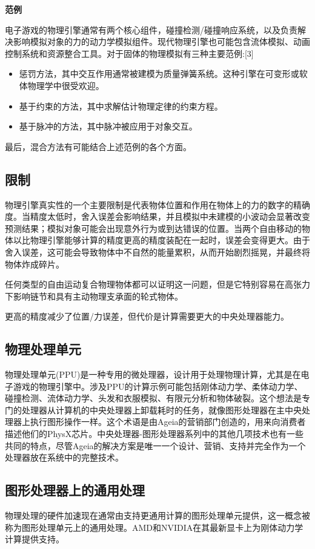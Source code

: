 \textbf{范例}

电子游戏的物理引擎通常有两个核心组件，碰撞检测/碰撞响应系统，以及负责解决影响模拟对象的力的动力学模拟组件。现代物理引擎也可能包含流体模拟、动画控制系统和资源整合工具。对于固体的物理模拟有三种主要范例:[3]
\begin{itemize}
\item 惩罚方法，其中交互作用通常被建模为质量弹簧系统。这种引擎在可变形或软体物理学中很受欢迎。
\item 基于约束的方法，其中求解估计物理定律的约束方程。
\item 基于脉冲的方法，其中脉冲被应用于对象交互。
\end{itemize}

最后，混合方法有可能结合上述范例的各个方面。
\subsection{限制}
物理引擎真实性的一个主要限制是代表物体位置和作用在物体上的力的数字的精确度。当精度太低时，舍入误差会影响结果，并且模拟中未建模的小波动会显著改变预测结果；模拟对象可能会出现意外行为或到达错误的位置。当两个自由移动的物体以比物理引擎能够计算的精度更高的精度装配在一起时，误差会变得更大。由于舍入误差，这可能会导致物体中不自然的能量累积，从而开始剧烈摇晃，并最终将物体炸成碎片。

任何类型的自由运动复合物理物体都可以证明这一问题，但是它特别容易在高张力下影响链节和具有主动物理支承面的轮式物体。

更高的精度减少了位置/力误差，但代价是计算需要更大的中央处理器能力。
\subsection{物理处理单元}
物理处理单元(PPU)是一种专用的微处理器，设计用于处理物理计算，尤其是在电子游戏的物理引擎中。涉及PPU的计算示例可能包括刚体动力学、柔体动力学、碰撞检测、流体动力学、头发和衣服模拟、有限元分析和物体破裂。这个想法是专门的处理器从计算机的中央处理器上卸载耗时的任务，就像图形处理器在主中央处理器上执行图形操作一样。这个术语是由Ageia的营销部门创造的，用来向消费者描述他们的PhysX芯片。中央处理器-图形处理器系列中的其他几项技术也有一些共同的特点，尽管Ageia的解决方案是唯一一个设计、营销、支持并完全作为一个处理器放在系统中的完整技术。
\subsection{图形处理器上的通用处理}
物理处理的硬件加速现在通常由支持更通用计算的图形处理单元提供，这一概念被称为图形处理单元上的通用处理。AMD和NVIDIA在其最新显卡上为刚体动力学计算提供支持。


